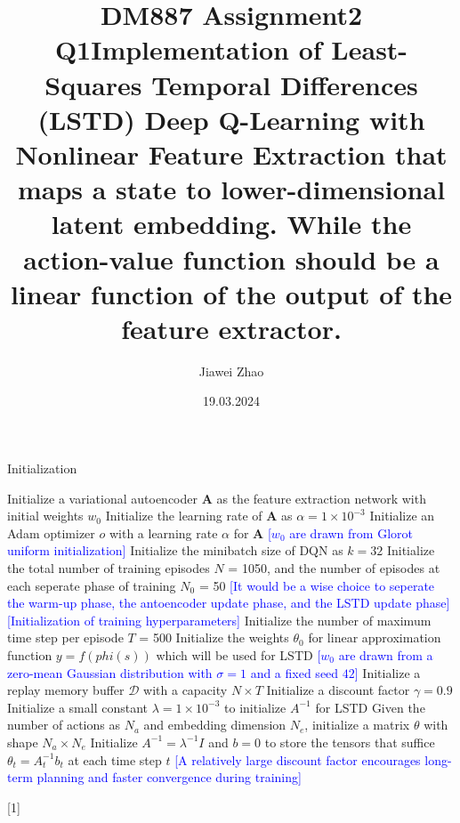 \documentclass[a4paper,12pt,oneside]{article}
\numberwithin{equation}{section}
\begin{document}
\title{DM887 Assignment2 Q1}
\author{Jiawei Zhao}
\date{19.03.2024}
\maketitle
\title {Implementation of Least-Squares Temporal Differences (LSTD) Deep Q-Learning with Nonlinear Feature Extraction that maps a state to lower-dimensional latent embedding. While the action-value function should be a linear function of the output of the feature extractor.}

\newcommand{\mycomment}[1]{{\fontfamily{lmss}\selectfont\textcolor{blue}{[#1]}}} %
    \begin{algorithm}
        \begin{algorithmic}[1]
        \caption{Initialization}
        \State Initialize a variational autoencoder $\mathbf{A}$ as the feature extraction network with initial weights \(w_0\)
        \State Initialize the learning rate of $\mathbf{A}$ as $\alpha=1 \times 10^{-3}$ 
        \State Initialize an Adam optimizer \(o\) with a learning rate $\alpha$ for $\mathbf{A}$
        \mycomment {\(w_0\) are drawn from Glorot uniform initialization}
        \State Initialize the minibatch size of DQN as \(k=32\) 
        \State Initialize the total number of training episodes \(N\) = 1050, and the number of episodes at each seperate phase of training \(N_0\) = 50
        \mycomment {It would be a wise choice to seperate the warm-up phase, the antoencoder update phase, and the LSTD update phase}
        \\
        \mycomment {Initialization of training hyperparameters}
        \State Initialize the number of maximum time step per episode \(T\) = 500
        \State Initialize the weights $\theta_0$ for linear approximation function $y = f(phi(s))$ which will be used for LSTD
        \mycomment {\(w_0\) are drawn from a zero-mean Gaussian distribution with $\sigma=1$ and a fixed seed $42$}
        \State Initialize a replay memory buffer $\mathcal{D}$ with a capacity \(N \times T\)
        \State Initialize a discount factor $\gamma=0.9$ 
        \State Initialize a small constant $\lambda=1 \times 10^{-3}$ to initialize $A^{-1}$ for LSTD
        \State Given the number of actions as \(N_a\) and embedding dimension \(N_e\), initialize a matrix $\theta$ with shape $N_a \times N_e$
        \State Initialize $A^{-1} = \lambda^{-1}I$ and $b=0$ to store the tensors that suffice $\theta_t = A_t^{-1} b_t$ at each time step \(t\)
        \mycomment{A relatively large discount factor encourages long-term planning and faster convergence during training}
        \end{algorithmic}[1]
    \end{algorithm}
        
\end{document}
